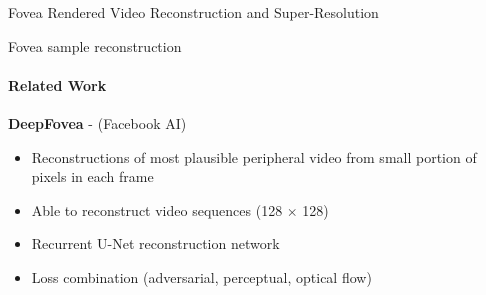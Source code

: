 \documentclass[
	ngerman,
	aspectratio=169,
	color={accentcolor=3d},
	logo=false,
	colorframetitle=true,
	]{tudabeamer}
\begin{document}
\begin{frame}{Fovea Rendered Video Reconstruction and Super-Resolution}
{\begin{center}
\end{center}}
\end{frame}


\begin{frame}{Fovea sample reconstruction}
\framesubtitle{Related Work}
\textbf{DeepFovea} - \citet{deepfovea} (Facebook AI)
\begin{itemize}
    \item Reconstructions of most plausible peripheral video from small portion of pixels in each frame
    \item Able to reconstruct video sequences (128 $\times$ 128)
    \item Recurrent U-Net reconstruction network
    \item Loss combination (adversarial, perceptual, optical flow)
\end{itemize}
\end{frame}

\end{document}
